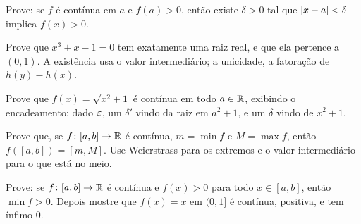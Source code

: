 \documentclass[11pt,a4paper]{article}
\begin{document}
\begin{exercicio}
Prove: se $f$ \'e cont\'inua em $a$ e $f(a)>0$, ent\~ao existe $\delta>0$ tal que $\left\lvert x-a \right\rvert<\delta$ implica $f(x)>0$.
\end{exercicio}

\begin{exercicio}
Prove que $x^3+x-1=0$ tem exatamente uma raiz real, e que ela pertence a $(0,1)$. A exist\^encia usa o valor intermedi\'ario; a unicidade, a fatora\c{c}\~ao de $h(y)-h(x)$.
\end{exercicio}

\begin{exercicio}
Prove que $f(x)=\sqrt{x^2+1}$ \'e cont\'inua em todo $a\in\mathbb{R}$, exibindo o encadeamento: dado $\varepsilon$, um $\delta'$ vindo da raiz em $a^2+1$, e um $\delta$ vindo de $x^2+1$.
\end{exercicio}

\begin{exercicio}
Prove que, se $f\colon[a,b]\to\mathbb{R}$ \'e cont\'inua, $m=\min f$ e $M=\max f$, ent\~ao $f([a,b])=[m,M]$. Use Weierstrass para os extremos e o valor intermedi\'ario para o que est\'a no meio.
\end{exercicio}

\begin{exercicio}
Prove: se $f\colon[a,b]\to\mathbb{R}$ \'e cont\'inua e $f(x)>0$ para todo $x\in[a,b]$, ent\~ao $\min f>0$. Depois mostre que $f(x)=x$ em $(0,1]$ \'e cont\'inua, positiva, e tem \'infimo $0$.
\end{exercicio}
\end{document}
